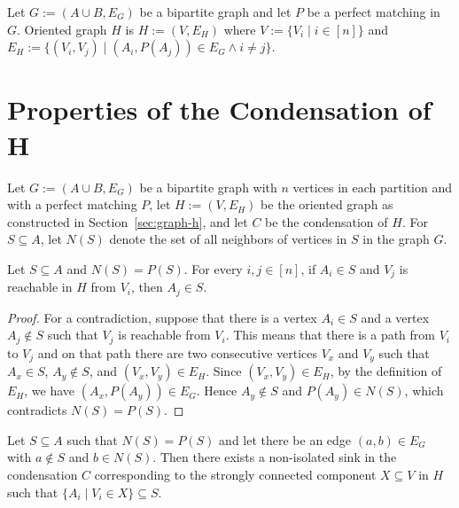 Let $G := (A \cup B, E_G)$ be a bipartite graph and let $P$ be a perfect matching in $G$.
Oriented graph $H$ is $H := (V, E_H)$ where $V := \{V_i \mid i \in [n]\}$ and
$E_H := \{ (V_i, V_j) \mid (A_i, P(A_j)) \in E_G \land i \neq j \}$.


\section{Properties of the Condensation of H}

Let $G := (A \cup B, E_G)$ be a bipartite graph with $n$ vertices in each partition and with a perfect matching $P$,
let $H := (V, E_H)$ be the oriented graph as constructed in Section~\ref{sec:graph-h}, and
let $C$ be the condensation of $H$.
For $S \subseteq A$, let $N(S)$ denote the set of all neighbors of vertices in $S$ in the graph $G$.

\begin{lemma}\label{lemma:lemma-2}
    Let $S \subseteq A$ and $N(S) = P(S)$.
    For every $i, j \in [n]$, if $A_i \in S$ and $V_j$ is reachable in $H$ from $V_i$,
    then $A_j \in S$.
\end{lemma}

\begin{proof}
    For a contradiction, suppose that there is a vertex $A_i \in S$ and a vertex $A_j \notin S$
    such that $V_j$ is reachable from $V_i$.
    This means that there is a path from $V_i$ to $V_j$ and on that path there are two consecutive vertices
    $V_x$ and $V_y$ such that $A_x \in S$, $A_y \notin S$, and $(V_x, V_y) \in E_H$.
    Since $(V_x, V_y) \in E_H$, by the definition of $E_H$, we have $(A_x, P(A_y)) \in E_G$.
    Hence $A_y \notin S$ and $P(A_y) \in N(S)$, which contradicts $N(S) = P(S)$.
\end{proof}

\begin{lemma}\label{lemma:lemma-3}
    Let $S \subseteq A$ such that $N(S) = P(S)$ and
    let there be an edge $(a, b) \in E_G$ with $a \notin S$ and $b \in N(S)$.
    Then there exists a non-isolated sink in the condensation $C$
    corresponding to the strongly connected component $X \subseteq V$ in $H$
    such that $\{A_i \mid V_i \in X\} \subseteq S$.
\end{lemma}

